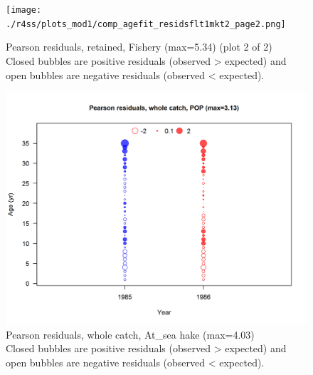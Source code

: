 \documentclass[12pt,]{article}
\begin{document}
\begin{figure}
\centering
\texttt{[image: ./r4ss/plots\_mod1/comp\_agefit\_residsflt1mkt2\_page2.png]}
\caption{Pearson residuals, retained, Fishery (max=5.34) (plot 2 of 2)\\
Closed bubbles are positive residuals (observed \textgreater{} expected)
and open bubbles are negative residuals (observed \textless{} expected).
\label{fig:fishery_age_pearson}}
\end{figure}

\begin{figure}
\centering
\includegraphics{./r4ss/plots_mod1/comp_agefit_residsflt2mkt0.png}
\caption{Pearson residuals, whole catch, At\_sea hake (max=4.03)\\
Closed bubbles are positive residuals (observed \textgreater{} expected)
and open bubbles are negative residuals (observed \textless{} expected).
\label{fig:ashop_age_pearson}}
\end{figure}
\end{document}
